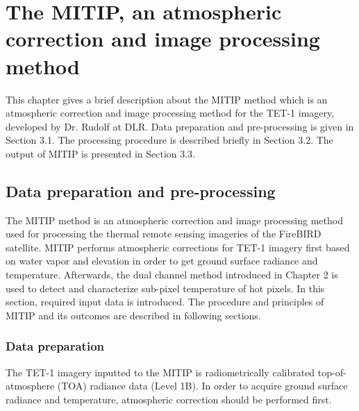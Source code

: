 \chapter{The MITIP, an atmospheric correction and image processing method}

\label{Chapter3}

This chapter gives a brief description about the MITIP method which is an atmospheric correction and image processing method for the TET-1 imagery, developed by Dr. Rudolf at DLR. Data preparation and pre-processing is given in Section 3.1. The processing procedure is described briefly in Section 3.2. The output of MITIP is presented in Section 3.3.\\


\section{Data preparation and pre-processing}
The MITIP method is an atmospheric correction and image processing method used for processing the thermal remote sensing imageries of the FireBIRD satellite. MITIP performs atmospheric corrections for TET-1 imagery first based on water vapor and elevation in order to get ground surface radiance and temperature. Afterwards, the dual channel method introduced in Chapter 2 is used to detect and characterize sub-pixel temperature of hot pixels. In this section, required input data is introduced. The procedure and principles of MITIP and its outcomes are described in following sections.\\


\subsection{Data preparation}
The TET-1 imagery inputted to the MITIP is radiometrically calibrated top-of-atmosphere (TOA) radiance data (Level 1B). In order to acquire ground surface radiance and temperature, atmospheric correction should be performed first.\\

